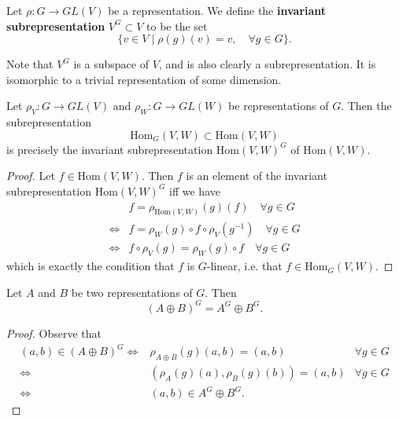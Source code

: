 \begin{defn}
Let $\rho \colon G \to GL(V)$ be a representation.  We define the \textbf{invariant subrepresentation} $V^G \subset V$ to be the set 
\[ \{ v \in V  \mid \rho(g)(v) = v,  \quad \forall g \in G \}. \]
\end{defn}
Note that $V^G$ is a subspace of $V$, and is also clearly a subrepresentation.   It is isomorphic to a trivial representation of some dimension.

\begin{prop}\label{invariant-subrprn}
Let  $\rho_V \colon G \to GL(V)$ and $\rho_W \colon G \to GL(W)$ be representations of $G$.  Then the subrepresentation 
\[ \text{Hom}_G (V,W) \subset \text{Hom} (V,W) \]
is precisely the invariant subrepresentation $\text{Hom}(V,W) ^G$ of $\text{Hom}(V,W)$.
\end{prop}
\begin{proof}
Let $f \in \text{Hom}(V,W)$.  Then $f$ is an element of the invariant subrepresentation $\text{Hom}(V,W) ^G$ iff we have
\begin{align*}
&f = \rho_{\text{Hom}(V,W)} (g)(f)  \quad \forall g \in G \\
\iff &f = \rho_W (g) \circ f \circ \rho_V (g^{-1}) \quad \forall g \in G \\ 
\iff & f \circ \rho_V (g) = \rho_W (g) \circ f \quad \forall g \in G
\end{align*}
which is exactly the condition that $f$ is $G$-linear, i.e. that $f \in \text{Hom}_G (V,W)$.
\end{proof}

\begin{lemma}\label{invariant-subrprn-of-dir-sum}
Let $A$ and $B$ be two representations of $G$.  Then \[ (A \oplus B)^ G = A^G \oplus B^G. \]
\end{lemma}
\begin{proof}Observe that
\begin{align*}
(a,b) \in (A \oplus B)^G \iff & \rho_{A \oplus B} (g) (a,b) = (a,b) &  \forall g \in G \\
\iff & (\rho_A (g) (a), \rho_B (g) (b)) = (a,b) &  \forall g \in G \\
\iff & (a,b) \in A^G \oplus B^G.
\end{align*}
\end{proof}

